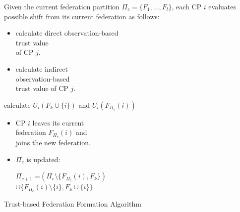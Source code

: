 \documentclass[preprint]{elsarticle}
\theoremstyle{definition}
\theoremstyle{remark}
\theoremstyle{property}
\begin{document}
\begin{algorithm}
\LinesNumbered
Given the current federation partition $\Pi_{c} = \{F_{1}, . .
. , F_{l}\}$, each CP $i$ evaluates possible shift from its
current federation as follows:

{
{
{
{
\begin{itemize}
\item calculate direct observation-based \\ trust
value \\ of CP $j$.
\end{itemize}
\Else
{
\begin{itemize}
\item calculate indirect \\ observation-based \\ trust value of
CP $j$.
\end{itemize}
}
}
}
calculate $U_{i}(F_{k} \cup \{i\})$ and $U_{i}(F_{\Pi_{c}}(i))$

{


\begin{itemize}
\item CP $i$ leaves its current \\ federation $F_{\Pi_{c}}(i)$ and \\ joins the new federation.

\item $\Pi_{c}$ is updated:

$\Pi_{c+1}$ =$(\Pi_{c}\setminus \{F_{\Pi_{c}}(i), F_{k}\})$ \\ $\cup \{F_{\Pi_{c}}({i}) \setminus \{{i}\}, F_{k} \cup \{{i}\}\}$.
\end{itemize}


}
}
}
\caption{Trust-based Federation Formation Algorithm}
\end{algorithm}
\end{document}
